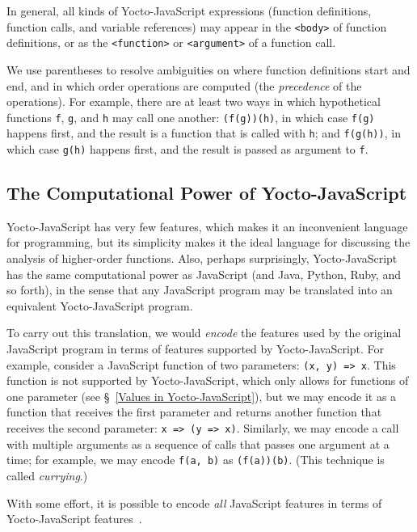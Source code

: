 \documentclass[12pt, oneside]{book}
\begin{document}
In general, all kinds of Yocto-JavaScript expressions (function definitions, function calls, and variable references) may appear in the \verb!<body>! of function definitions, or as the \verb!<function>! or \verb!<argument>! of a function call.

We use parentheses to resolve ambiguities on where function definitions start and end, and in which order operations are computed (the \emph{precedence} of the operations). For example, there are at least two ways in which hypothetical functions \texttt{f}, \texttt{g}, and \texttt{h} may call one another: \texttt{(f(g))(h)}, in which case \texttt{f(g)} happens first, and the result is a function that is called with \texttt{h}; and \texttt{f(g(h))}, in which case \texttt{g(h)} happens first, and the result is passed as argument to \texttt{f}.

\subsection{The Computational Power of Yocto-JavaScript}

Yocto-JavaScript has very few features, which makes it an inconvenient language for programming, but its simplicity makes it the ideal language for discussing the analysis of higher-order functions. Also, perhaps surprisingly, Yocto-JavaScript has the same computational power as JavaScript (and Java, Python, Ruby, and so forth), in the sense that any JavaScript program may be translated into an equivalent Yocto-JavaScript program.

To carry out this translation, we would \emph{encode} the features used by the original JavaScript program in terms of features supported by Yocto-JavaScript. For example, consider a JavaScript function of two parameters: \texttt{(x, y) => x}. This function is not supported by Yocto-JavaScript, which only allows for functions of one parameter (see §~\ref{Values in Yocto-JavaScript}), but we may encode it as a function that receives the first parameter and returns another function that receives the second parameter: \texttt{x => (y => x)}. Similarly, we may encode a call with multiple arguments as a sequence of calls that passes one argument at a time; for example, we may encode \texttt{f(a, b)} as \texttt{(f(a))(b)}. (This technique is called \emph{currying}.)

With some effort, it is possible to encode \emph{all} JavaScript features in terms of Yocto-JavaScript features~\cite[§~6]{understanding-computation}.
\end{document}
